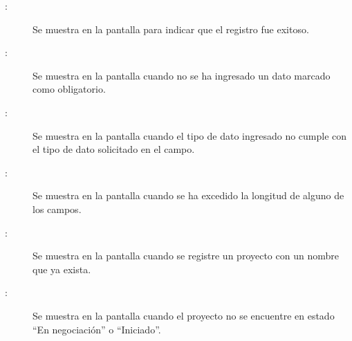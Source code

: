 \begin{description}
	\item[:] Se muestra en la pantalla  para indicar que el registro fue exitoso.
	\item[:] Se muestra en la pantalla  cuando no se ha ingresado un dato marcado como obligatorio.
	\item[:] Se muestra en la pantalla  cuando el tipo de dato ingresado no cumple con el tipo de dato solicitado en el campo.
	\item[:] Se muestra en la pantalla  cuando se ha excedido la longitud de alguno de los campos.
	\item[:] Se muestra en la pantalla  cuando se registre un proyecto con un nombre que ya exista.
	\item[:] Se muestra en la pantalla  cuando el proyecto no se encuentre en estado ``En negociación'' o ``Iniciado''.
\end{description}
